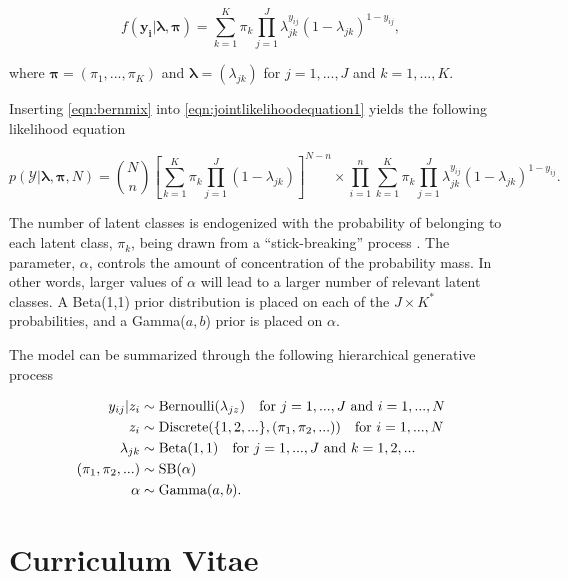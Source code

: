 \documentclass[
  12pt,
]{article}
\begin{document}
\begin{equation}
\label{eqn:bernmix}
f(\boldsymbol{y_i}|\boldsymbol{\lambda,\pi}) = \sum_{k=1}^K \pi_k \prod_{j=1}^J \lambda_{jk}^{y_{ij}}(1-\lambda_{jk})^{1-y_{ij}},
\end{equation}

where \(\boldsymbol{\pi}=(\pi_1,...,\pi_K)\) and
\(\boldsymbol{\lambda} = (\lambda_{jk})\) for \(j=1,...,J\) and
\(k=1,...,K\).

Inserting \autoref{eqn:bernmix} into
\autoref{eqn:jointlikelihoodequation1} yields the following likelihood
equation

\begin{equation}
\label{eqn:LCMCRlikelihood}
p(\mathcal{Y}|\boldsymbol{\lambda},\boldsymbol{\pi},N)=\binom{N}{n} \left[ \sum_{k=1}^K \pi_k \prod_{j=1}^J (1-\lambda_{jk}) \right]^{N-n} \times \prod_{i=1}^n \sum_{k=1}^K \pi_k \prod_{j=1}^J \lambda_{jk}^{y_{ij}}(1-\lambda_{jk})^{1-y_{ij}}.
\end{equation}

The number of latent classes is endogenized with the probability of
belonging to each latent class, \(\pi_k\), being drawn from a
``stick-breaking'' process \citep{sethuraman_constructive_1991}. The
parameter, \(\alpha\), controls the amount of concentration of the
probability mass. In other words, larger values of \(\alpha\) will lead
to a larger number of relevant latent classes. A Beta(1,1) prior
distribution is placed on each of the \(J \times K^*\) probabilities,
and a Gamma(\(a,b\)) prior is placed on \(\alpha\).

The model can be summarized through the following hierarchical
generative process

\begin{align} 
\nonumber y_{ij}|z_i & \sim \text{Bernoulli}(\lambda_{jz}) \hspace{10px} \text{for } j=1,...,J \text{ and } i=1,...,N\\  \nonumber
z_i & \sim \text{Discrete}(\{1,2,...\},(\pi_1,\pi_2,...)) \hspace{10px} \text{for } i=1,...,N \\ \nonumber
\lambda_{jk} & \sim \text{Beta}(1,1) \hspace{10px} \text{for } j=1,...,J \text{ and } k=1,2,... \\ \nonumber
(\pi_1,\pi_2,...) & \sim \text{SB}(\alpha) \\ 
\alpha & \sim \text{Gamma}(a,b).
\end{align}

\newpage

\renewcommand{\bibname}{References}


\newpage

\pagestyle{empty}
\section*{Curriculum Vitae}\label{curriculumvitae}
\end{document}
